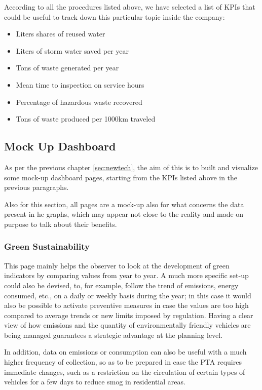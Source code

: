 According to all the procedures listed above, we have selected a list of KPIs that could be useful to track down this particular topic inside the company:

\begin{itemize}
    \item Liters shares of reused water
    \item Liters of storm water saved per year
    \item Tons of waste generated per year
    \item Mean time to inspection on service hours
    \item Percentage of hazardous waste recovered
    \item Tons of waste produced per 1000km traveled
\end{itemize}

\subsection{Mock Up Dashboard}
As per the previous chapter \ref{sec:newtech}, the aim of this is to built and visualize some mock-up dashboard pages, starting from the KPIs listed above in the previous paragraphs.

Also for this section, all pages are a mock-up also for what concerns the data present in he graphs, which may appear not close to the reality and made on purpose to talk about their benefits.

\newpage

\newpage
\begin{landscape}
\thispagestyle{empty}

\end{landscape}

\subsubsection{Green Sustainability}
This page mainly helps the observer to look at the development of green indicators by comparing values from year to year. A much more specific set-up could also be devised, to, for example, follow the trend of emissions, energy consumed, etc., on a daily or weekly basis during the year; in this case it would also be possible to activate preventive measures in case the values are too high compared to average trends or new limits imposed by regulation.
Having a clear view of how emissions and the quantity of environmentally friendly vehicles are being managed guarantees a strategic advantage at the planning level.

In addition, data on emissions or consumption can also be useful with a much higher frequency of collection, so as to be prepared in case the PTA requires immediate changes, such as a restriction on the circulation of certain types of vehicles for a few days to reduce smog in residential areas.
 
